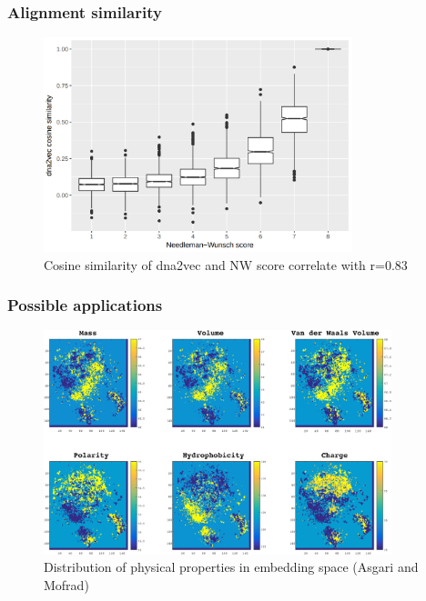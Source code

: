 \documentclass[11pt,xcolor=x11names,compress]{beamer}
\renewcommand{\(}{\begin{columns}}
\renewcommand{\)}{\end{columns}}
\newcommand{\<}[1]{\begin{column}{#1}}
\renewcommand{\>}{\end{column}}
\begin{document}
\begin{frame}
	\frametitle{Alignment similarity}
	\begin{figure}
		\includegraphics[width=0.8\textwidth]{alignment.png}
		\caption*{\tiny{Cosine similarity of dna2vec and NW score correlate with r=0.83}}
	\end{figure}
\end{frame}

\begin{frame}
	\frametitle{Possible applications}
	\begin{figure}
		\includegraphics[width=0.9\textwidth]{properties.png}
		\caption*{\tiny{Distribution of physical properties in embedding space (Asgari and Mofrad)}}
	\end{figure}
\end{frame}
\end{document}
